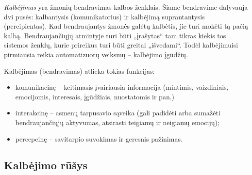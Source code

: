 \emph{Kalbėjimas} yra žmonių bendravimas kalbos ženklais. Šiame bendravime
dalyvauja dvi pusės: kalbantysis (komunikatorius) ir kalbėjimą 
suprantantysis (percipientas). Kad bendraujantys žmonės galėtų kalbėtis, 
jie turi mokėti tą pačią kalbą. Bendraujančiųjų atmintyje turi būti 
„įrašytas“ tam tikras kiekis tos sistemos ženklų, kurie prireikus
turi būti greitai „išvedami“. Todėl kalbėjimuisi pirmiausia reikia 
automatizuotų veiksmų – kalbėjimo įgūdžių.

Kalbėjimas (bendravimas) atlieka tokias funkcijas:
\begin{itemize}
  \item komunikacinę – keitimasis įvairiausia informacija (mintimis,
    vaizdiniais, emocijomis, interesais, įgūdžiais, nuostatomis ir
    pan.)
  \item interakcinę – asmenų tarpusavio sąveika (gali padidėti arba 
    sumažėti bendraujančiųjų aktyvumas, atsirasti teigiamų ir neigiamų
    emocijų);
  \item percepcinę – savitarpio suvokimas ir geresnis pažinimas.
\end{itemize}

\subsection{Kalbėjimo rūšys}

